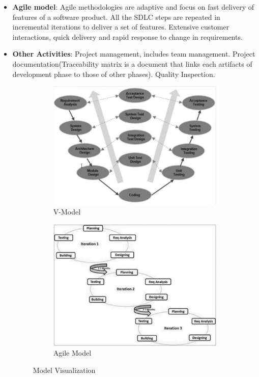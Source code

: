 \documentclass[a4paper]{article}
\begin{document}
\begin{itemize}
    \item \textbf{Agile model}: Agile methodologies are adaptive and focus on fast delivery of features of a software product. All the SDLC steps are repeated in incremental iterations to deliver a set of features. Extensive customer interactions, quick delivery and rapid response to change in requirements.
    \item \textbf{Other Activities}: Project management, includes team management. Project documentation(Traceability matrix is a document that links each artifacts of development phase to those of other phases). Quality Inspection.
    \begin{figure}[H]
        \centering
        \begin{subfigure}[b]{0.45\textwidth}
            \includegraphics[width=\textwidth]{Degree/static/ST_v_model.png}
            \caption{V-Model}
            \label{fig:ST-v-model}
        \end{subfigure}
        \hfill
        \begin{subfigure}[b]{0.45\textwidth}
            \includegraphics[width=\textwidth]{Degree/static/ST_agile_model.png}
            \caption{Agile Model}
            \label{fig:ST-agile-model}
        \end{subfigure}
        \caption{Model Visualization}
        \label{fig:ST-model-visualizations}
    \end{figure}
\end{itemize}
\end{document}
